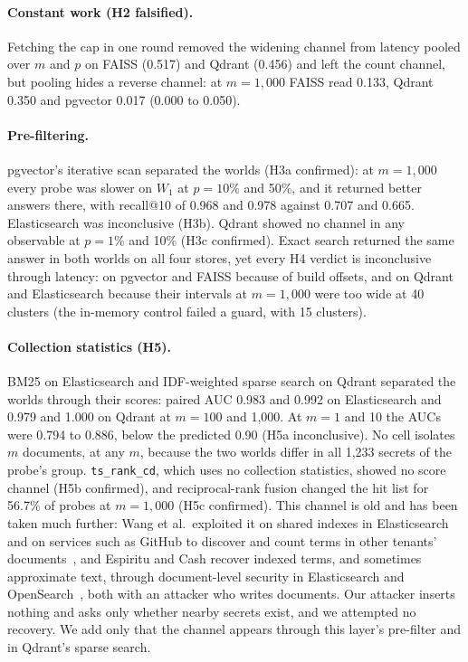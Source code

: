 \paragraph{Constant work (H2 falsified).}
Fetching the cap in one round removed the widening channel from latency pooled over $m$ and $p$ on FAISS (0.517) and Qdrant (0.456) and left the count channel, but pooling hides a reverse channel: at $m = 1{,}000$ FAISS read 0.133, Qdrant 0.350 and pgvector 0.017 (0.000 to 0.050).

\paragraph{Pre-filtering.}
pgvector's iterative scan separated the worlds (H3a confirmed): at $m = 1{,}000$ every probe was slower on $W_1$ at $p = 10\%$ and 50\%, and it returned better answers there, with recall@10 of 0.968 and 0.978 against 0.707 and 0.665. Elasticsearch was inconclusive (H3b).
Qdrant showed no channel in any observable at $p = 1\%$ and 10\% (H3c confirmed). Exact search
returned the same answer in both worlds on all four stores, yet every H4 verdict
is inconclusive through latency: on pgvector and FAISS because of build offsets, and on Qdrant and Elasticsearch because their intervals at $m = 1{,}000$ were too wide at 40 clusters (the in-memory control failed a guard, with 15 clusters).

\paragraph{Collection statistics (H5).}
BM25 on Elasticsearch and IDF-weighted sparse search on Qdrant separated the worlds through their scores: paired AUC 0.983 and 0.992 on Elasticsearch
and 0.979 and 1.000 on Qdrant at $m = 100$ and 1,000. At $m = 1$ and 10 the AUCs were 0.794 to 0.886, below the predicted 0.90 (H5a inconclusive). No cell isolates $m$ documents,
at any $m$, because the two worlds differ in all 1,233 secrets of the probe's group. \texttt{ts\_rank\_cd}, which uses
no collection statistics, showed no score channel (H5b confirmed), and reciprocal-rank fusion changed the hit list for 56.7\% of probes at $m = 1{,}000$
(H5c confirmed). This channel is old and has been taken much further: Wang et al.\ exploited it on shared indexes in Elasticsearch and on services such as GitHub to discover and count terms in other tenants' documents~\cite{wang2017sidechannel}, and Espiritu and Cash recover indexed terms, and sometimes approximate text, through document-level security in Elasticsearch and OpenSearch~\cite{espiritu2026plaintext}, both with an attacker who writes documents. Our attacker inserts nothing and asks only whether nearby secrets exist, and we attempted no recovery. We add only that the channel appears through this layer's pre-filter and in Qdrant's sparse search.

